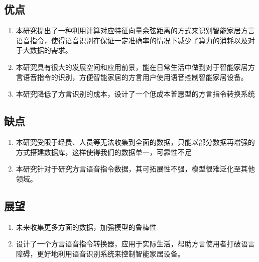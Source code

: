 \documentclass[lang=cn,cite=super]{elegantpaper}
\begin{document}
\subsection{优点}
\begin{enumerate}
    \item 本研究提出了一种利用计算对应特征向量余弦距离的方式来识别智能家居方言语音指令，使得语音识别在保证一定准确率的情况下减少了算力的消耗以及对于大数据的需求。
    \item 本研究具有很大的发展空间和应用前景，能在日常生活中做到对于智能家居方言语音指令的识别，方便智能家居的方言用户使用语音控制智能家居设备。
    \item 本研究降低了方言识别的成本，设计了一个低成本普惠型的方言指令转换系统 
\end{enumerate}
\subsection{缺点}
\begin{enumerate}
    \item 本研究受限于经费、人员等无法收集到全面的数据，只能以部分数据再增强的方式搭建数据库，这样使得我们的数据单一，可靠性不足
    \item 本研究针对于研究方言语音指令数据，其可拓展性不强，模型很难泛化至其他领域。
\end{enumerate}
\subsection{展望}
\begin{enumerate}
    \item 未来收集更多方面的数据，加强模型的鲁棒性
    \item 设计了一个方言语音指令转换器，应用于实际生活，帮助方言使用者打破语言障碍，更好地利用语音识别系统来控制智能家居设备。 
\end{enumerate}
\newpage
\end{document}
